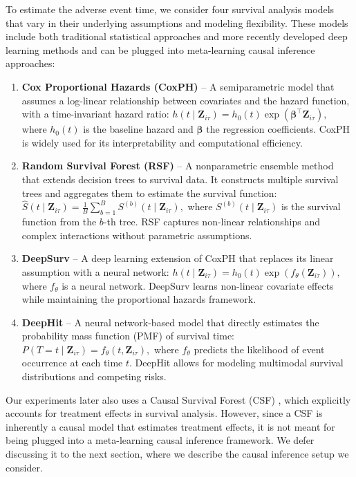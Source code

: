 To estimate the adverse event time, we consider four survival analysis models that vary in their underlying assumptions and modeling flexibility. 
These models include both traditional statistical approaches and more recently developed deep learning methods and can be plugged into meta-learning causal inference approaches:
\begin{enumerate}[itemsep=0pt]
    \item \textbf{Cox Proportional Hazards (CoxPH)} \citep{cox1972regression} – A semiparametric model that assumes a log-linear relationship between covariates and the hazard function, with a time-invariant hazard ratio:
    \(
    h(t \mid \mathbf{Z}_{i\tau}) = h_0(t) \exp(\boldsymbol{\beta}^{\top} \mathbf{Z}_{i\tau}),
    \)
    where \( h_0(t) \) is the baseline hazard and \( \boldsymbol{\beta} \) the regression coefficients. CoxPH is widely used for its interpretability and computational efficiency.

    \item \textbf{Random Survival Forest (RSF)} \citep{ishwaran2008random} – A nonparametric ensemble method that extends decision trees to survival data. It constructs multiple survival trees and aggregates them to estimate the survival function:
    \(
    \widehat{S}(t \mid \mathbf{Z}_{i\tau}) = \frac{1}{B} \sum_{b=1}^{B} S^{(b)}(t \mid \mathbf{Z}_{i\tau}),
    \)
    where \( S^{(b)}(t \mid \mathbf{Z}_{i\tau}) \) is the survival function from the \( b \)-th tree. RSF captures non-linear relationships and complex interactions without parametric assumptions.

    \item \textbf{DeepSurv} \citep{katzman2018deepsurv} – A deep learning extension of CoxPH that replaces its linear assumption with a neural network:
    \(
    h(t \mid \mathbf{Z}_{i\tau}) = h_0(t) \exp(f_{\theta}(\mathbf{Z}_{i\tau})),
    \)
    where \( f_{\theta} \) is a neural network. DeepSurv learns non-linear covariate effects while maintaining the proportional hazards framework.

    \item \textbf{DeepHit} \citep{lee2018deephit} – A neural network-based model that directly estimates the probability mass function (PMF) of survival time:
    \(
    P(T = t \mid \mathbf{Z}_{i\tau}) = f_{\theta}(t, \mathbf{Z}_{i\tau}),
    \)
    where \( f_{\theta} \) predicts the likelihood of event occurrence at each time \( t \). DeepHit allows for modeling multimodal survival distributions and competing risks.
\end{enumerate}
Our experiments later also uses a Causal Survival Forest (CSF) \citep{cui2023estimating}, which explicitly accounts for treatment effects in survival analysis. However, since a CSF is inherently a causal model that estimates treatment effects, it is not meant for being plugged into a meta-learning causal inference framework. We defer discussing it to the next section, where we describe the causal inference setup we consider. 